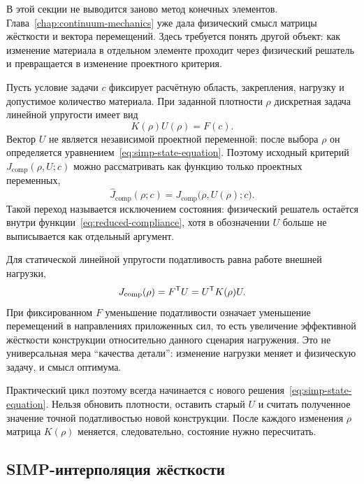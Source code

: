В этой секции не выводится заново метод конечных элементов. Глава~\ref{chap:continuum-mechanics} уже дала физический смысл матрицы жёсткости и вектора перемещений. Здесь требуется понять другой объект: как изменение материала в отдельном элементе проходит через физический решатель и превращается в изменение проектного критерия.

Пусть условие задачи $c$ фиксирует расчётную область, закрепления, нагрузку и допустимое количество материала. При заданной плотности $\rho$ дискретная задача линейной упругости имеет вид
\begin{equation}
\label{eq:simp-state-equation}
 K(\rho)U(\rho)=F(c).
\end{equation}
Вектор $U$ не является независимой проектной переменной: после выбора $\rho$ он определяется уравнением~\eqref{eq:simp-state-equation}. Поэтому исходный критерий $J_{\mathrm{comp}}(\rho,U;c)$ можно рассматривать как функцию только проектных переменных,
\begin{equation}
\label{eq:reduced-compliance}
 \widehat J_{\mathrm{comp}}(\rho;c)
 =
 J_{\mathrm{comp}}\bigl(\rho,U(\rho);c\bigr).
\end{equation}
Такой переход называется исключением состояния: физический решатель остаётся внутри функции~\eqref{eq:reduced-compliance}, хотя в обозначении $U$ больше не выписывается как отдельный аргумент.

Для статической линейной упругости податливость равна работе внешней нагрузки,
\begin{equation}
 J_{\mathrm{comp}}(\rho)
 =F^{\mathsf{T}}U
 =U^{\mathsf{T}}K(\rho)U.
\end{equation}
При фиксированном $F$ уменьшение податливости означает уменьшение перемещений в направлениях приложенных сил, то есть увеличение эффективной жёсткости конструкции относительно данного сценария нагружения. Это не универсальная мера ``качества детали'': изменение нагрузки меняет и физическую задачу, и смысл оптимума.

Практический цикл поэтому всегда начинается с нового решения~\eqref{eq:simp-state-equation}. Нельзя обновить плотности, оставить старый $U$ и считать полученное значение точной податливостью новой конструкции. После каждого изменения $\rho$ матрица $K(\rho)$ меняется, следовательно, состояние нужно пересчитать.

\subsection{SIMP-интерполяция жёсткости}


